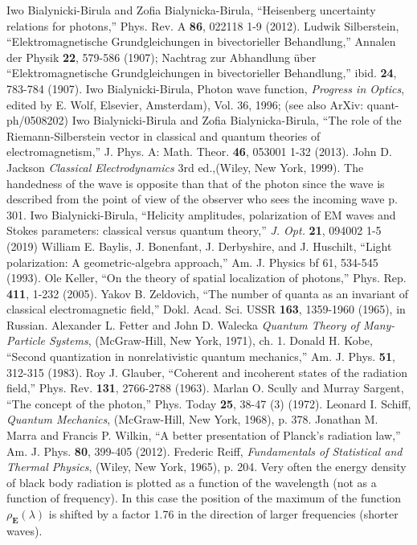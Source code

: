\documentclass[twocolumn,aps,pra,10pt]{revtex4-1}
\begin{document}
\begin{thebibliography}{00}
 Iwo Bialynicki-Birula and Zofia Bialynicka-Birula, ``Heisenberg uncertainty relations for photons,'' Phys. Rev. A {\bf 86}, 022118 1-9 (2012).
 Ludwik Silberstein, ``Elektromagnetische Grundgleichungen in bivectorieller Behandlung,'' Annalen der Physik {\bf 22}, 579-586 (1907); Nachtrag zur Abhandlung \"uber ``Elektromagnetische Grundgleichungen in bivectorieller Behandlung,'' ibid. {\bf 24}, 783-784 (1907).
 Iwo Bialynicki-Birula, Photon wave function, {\em Progress in Optics}, edited by E. Wolf, Elsevier, Amsterdam), Vol. 36, 1996; (see also ArXiv: quant-ph/0508202)
 Iwo Bialynicki-Birula and Zofia Bialynicka-Birula, ``The role of the Riemann-Silberstein vector in classical and quantum theories of electromagnetism,'' J. Phys. A: Math. Theor. {\bf 46}, 053001 1-32 (2013).
 John D. Jackson {\em Classical Electrodynamics} 3rd ed.,(Wiley, New York, 1999).
 The handedness of the wave is opposite than that of the photon since the wave is described from the point of view of the observer who sees the incoming wave \cite{jack} p. 301.
 Iwo Bialynicki-Birula, ``Helicity amplitudes, polarization of EM waves and Stokes parameters: classical versus quantum theory,'' {\em J. Opt.} {\bf 21}, 094002 1-5 (2019)
 William E. Baylis, J. Bonenfant, J. Derbyshire, and J. Huschilt, ``Light polarization: A geometric-algebra approach,'' Am. J. Physics {bf 61}, 534-545 (1993).
 Ole Keller, ``On the theory of spatial localization of photons,'' Phys. Rep. {\bf 411}, 1-232 (2005).
 Yakov B. Zeldovich, ``The number of quanta as an invariant of classical electromagnetic field,'' Dokl. Acad. Sci. USSR {\bf 163}, 1359-1960 (1965), in Russian.
 Alexander L. Fetter and John D. Walecka {\em Quantum Theory of Many-Particle Systems}, (McGraw-Hill, New York, 1971), ch. 1.
 Donald H. Kobe, ``Second quantization in nonrelativistic quantum mechanics,'' Am. J. Phys. {\bf 51}, 312-315 (1983).
 Roy J. Glauber, ``Coherent and incoherent states of the radiation field,'' Phys. Rev. {\bf 131}, 2766-2788 (1963).
 Marlan O. Scully and Murray Sargent, ``The concept of the photon,'' Phys. Today {\bf 25}, 38-47 (3) (1972).
 Leonard I. Schiff, {\em Quantum Mechanics}, (McGraw-Hill, New York, 1968), p. 378.
 Jonathan M. Marra and Francis P. Wilkin, ``A better presentation of Planck’s radiation law,'' Am. J. Phys. {\bf 80}, 399-405 (2012).
 Frederic Reiff, {\em Fundamentals of Statistical and Thermal Physics}, (Wiley, New York, 1965), p. 204.
 Very often the energy density of black body radiation is plotted as a function of the wavelength (not as a function of frequency). In this case the position of the maximum of the function $\rho_{\bm E}(\lambda)$ is shifted by a factor 1.76 in the direction of larger frequencies (shorter waves).
\end{thebibliography}
\end{document}

